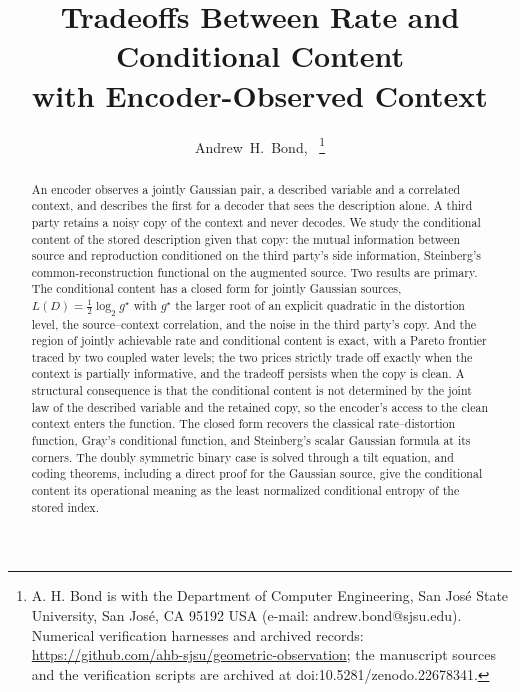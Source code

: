 \documentclass[11pt,onecolumn]{IEEEtran}
\begin{document}
\title{Tradeoffs Between Rate and Conditional Content\\ with Encoder-Observed Context}

\author{Andrew~H.~Bond,~%
\thanks{A. H. Bond is with the Department of Computer Engineering, San Jos\'e
State University, San Jos\'e, CA 95192 USA (e-mail: andrew.bond@sjsu.edu).
Numerical verification harnesses and archived records:
\url{https://github.com/ahb-sjsu/geometric-observation}; the manuscript sources and the verification scripts are archived at doi:10.5281/zenodo.22678341.}}


\maketitle

\begin{abstract}
An encoder observes a jointly Gaussian pair, a described variable and a
correlated context, and describes the first for a decoder that sees the
description alone. A third party retains a noisy copy of the context and
never decodes. We study the conditional content of the stored
description given that copy: the mutual information between source and
reproduction conditioned on the third party's side information,
Steinberg's common-reconstruction functional on the augmented source.
Two results are primary. The conditional content has a closed form for
jointly Gaussian sources, $L(D)=\tfrac12\log_2 g^\star$ with $g^\star$
the larger root of an explicit quadratic in the distortion level, the
source--context correlation, and the noise in the third party's copy.
And the region of jointly achievable rate and conditional content is
exact, with a Pareto frontier traced by two coupled water levels; the
two prices strictly trade off exactly when the context is partially
informative, and the tradeoff persists when the copy is clean. A structural consequence is that the
conditional content is not determined by the joint law of the described
variable and the retained copy, so the encoder's access to the clean
context enters the function. The closed form recovers the classical
rate--distortion function, Gray's conditional function, and Steinberg's
scalar Gaussian formula at its corners. The doubly symmetric binary case
is solved through a tilt equation, and coding theorems, including a
direct proof for the Gaussian source, give the conditional content its
operational meaning as the least normalized conditional entropy of the
stored index.
\end{abstract}
\end{document}
